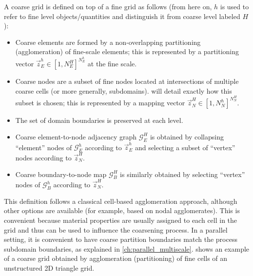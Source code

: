 A coarse grid is defined on top of a fine grid as follows (from here on, $h$ is used to refer to fine level objects/quantities and distinguish it from coarse level labeled $H$):
\begin{itemize}
    \item Coarse elements are formed by a non-overlapping partitioning (agglomeration) of fine-scale elements; this is represented by a partitioning vector $\vec{z}_E^h \in [1,N_E^H]^{N_E^h}$ at the fine scale.
    \item Coarse nodes are a subset of fine nodes located at intersections of multiple coarse cells (or more generally, subdomains).  will detail exactly how this subset is chosen; this is represented by a mapping vector $\vec{z}_N^H \in [1,N_N^h]^{N_N^H}$.
    \item The set of domain boundaries is preserved at each level.
    \item Coarse element-to-node adjacency graph $\mathcal{G}_E^H$ is obtained by collapsing ``element'' nodes of $\mathcal{G}_E^h$ according to $\vec{z}_E^h$ and selecting a subset of ``vertex'' nodes according to $\vec{z}_N^H$.
    \item Coarse boundary-to-node map $\mathcal{G}_B^H$ is similarly obtained by selecting ``vertex'' nodes of $\mathcal{G}_B^h$ according to $\vec{z}_N^H$.
\end{itemize}
This definition follows a classical cell-based agglomeration approach, although other options are available (for example, based on nodal agglomerates).   This is convenient because material properties are usually assigned to each cell in the grid and thus can be used to influence the coarsening process.   In a parallel setting, it is convenient to have coarse partition boundaries match the process subdomain boundaries, as explained in \cref{ch:parallel_multiscale}.    shows an example of a coarse grid obtained by agglomeration (partitioning) of fine cells of an unstructured 2D triangle grid.


